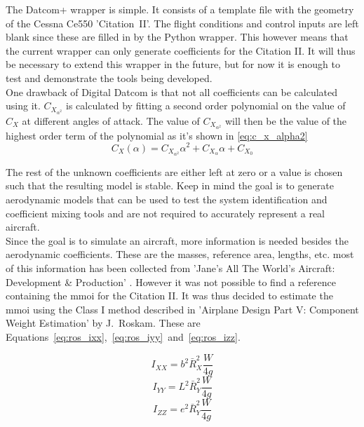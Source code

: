 The Datcom+ wrapper is simple. It consists of a template file with the geometry of the Cessna Ce550 'Citation~II'. The flight conditions and control inputs are left blank since these are filled in by the Python wrapper. This however means that the current wrapper can only generate coefficients for the Citation II. It will thus be necessary to extend this wrapper in the future, but for now it is enough to test and demonstrate the tools being developed.\\

One drawback of Digital Datcom is that not all coefficients can be calculated using it. $C_{X_{\alpha^2}}$ is calculated by fitting a second order polynomial on the value of $C_X$ at different angles of attack. The value of $C_{X_{\alpha^2}}$ will then be the value of the highest order term of the polynomial as it's shown in \autoref{eq:c_x_alpha2}\\

\begin{equation}
\label{eq:c_x_alpha2}
{C_X}(\alpha ) = {C_{X_{\alpha ^2}}}{\alpha ^2} + {C_{{X_\alpha }}}\alpha  + {C_{{X_0}}}
\end{equation}
 
The rest of the unknown coefficients are either left at zero or a value is chosen such that the resulting model is stable. Keep in mind the goal is to generate aerodynamic models that can be used to test the system identification and coefficient mixing tools and are not required to accurately represent a real aircraft. \\

Since the goal is to simulate an aircraft, more information is needed besides the aerodynamic coefficients. These are the masses, reference area, lengths, etc. most of this information has been collected from 'Jane's All The World's Aircraft: Development \& Production' \cite{janes}. However it was not possible to find a reference containing the \gls{mmoi} for the Citation II. It was thus decided to estimate the \gls{mmoi} using the Class I method described in 'Airplane Design Part V: Component Weight Estimation' by J.~Roskam\cite{roskam_5}. These are Equations~\ref{eq:ros_ixx},~\ref{eq:ros_iyy}~and~\ref{eq:ros_izz}.


\begin{equation}
    \label{eq:ros_ixx}
    {I_{XX}} = {b^2}\bar R_X^2\frac{W}{{4g}}
\end{equation}
\begin{equation}
    \label{eq:ros_iyy}
    {I_{YY}} = {L^2}\bar R_Y^2\frac{W}{{4g}}
\end{equation}
\begin{equation}
    \label{eq:ros_izz}
    {I_{ZZ}} = {e^2}\bar R_Y^2\frac{W}{{4g}}
\end{equation}

